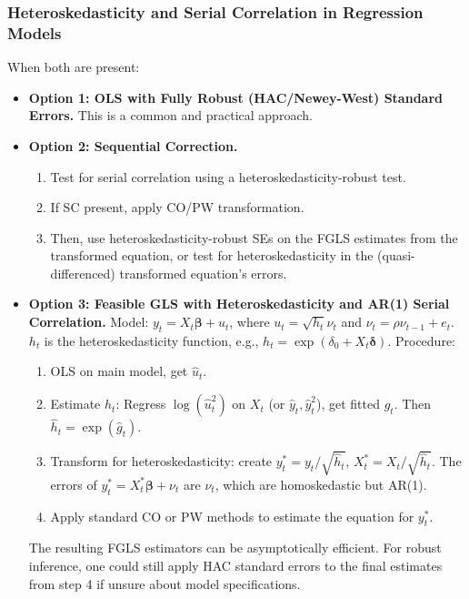\documentclass[a4paper, 10pt]{article}
\theoremstyle{definition}	%
\begin{document}
\subsubsection{Heteroskedasticity and Serial Correlation in Regression Models}
When both are present:
\begin{itemize}
    \item \textbf{Option 1: OLS with Fully Robust (HAC/Newey-West) Standard Errors.} This is a common and practical approach.
    \item \textbf{Option 2: Sequential Correction.}
    \begin{enumerate}
        \item Test for serial correlation using a heteroskedasticity-robust test.
        \item If SC present, apply CO/PW transformation.
        \item Then, use heteroskedasticity-robust SEs on the FGLS estimates from the transformed equation, or test for heteroskedasticity in the (quasi-differenced) transformed equation's errors.
    \end{enumerate}
    \item \textbf{Option 3: Feasible GLS with Heteroskedasticity and AR(1) Serial Correlation.}
    Model: \(y_t = X_t\boldsymbol{\beta} + u_t\), where \(u_t = \sqrt{h_t} \nu_t\) and \(\nu_t = \rho \nu_{t-1} + e_t\).
    \(h_t\) is the heteroskedasticity function, e.g., \(h_t = \exp(\delta_0 + X_t\boldsymbol{\delta})\).
    Procedure:
    \begin{enumerate}
        \item OLS on main model, get \(\hat{u}_t\).
        \item Estimate \(h_t\): Regress \(\log(\hat{u}_t^2)\) on \(X_t\) (or \(\hat{y}_t, \hat{y}_t^2\)), get fitted \(\hat{g}_t\). Then \(\hat{h}_t = \exp(\hat{g}_t)\).
        \item Transform for heteroskedasticity: create \(y_t^* = y_t/\sqrt{\hat{h}_t}\), \(X_t^* = X_t/\sqrt{\hat{h}_t}\). The errors of \(y_t^* = X_t^*\boldsymbol{\beta} + \nu_t\) are \( \nu_t \), which are homoskedastic but AR(1).
        \item Apply standard CO or PW methods to estimate the equation for \(y_t^*\).
    \end{enumerate}
    The resulting FGLS estimators can be asymptotically efficient. For robust inference, one could still apply HAC standard errors to the final estimates from step 4 if unsure about model specifications.
\end{itemize}
\end{document}
